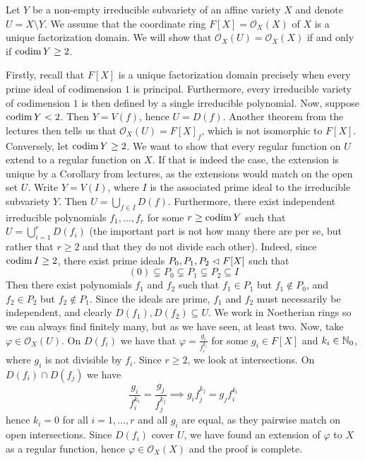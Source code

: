 \documentclass[a4paper, 12pt]{article}
\begin{document}
\begin{Exercise}
    Let $Y$ be a non-empty irreducible subvariety of an affine variety $X$ and denote $U = X \setminus Y$.
    We assume that the coordinate ring $F[X] = \mathcal{O}_X(X)$ of $X$ is a unique factorization domain.
    We will show that $\mathcal{O}_X(U) = \mathcal{O}_X(X)$ if and only if $\operatorname{codim} Y \geq 2$.

    Firstly, recall that $F[X]$ is a unique factorization domain precisely when every prime ideal of codimension $1$ is principal.
    Furthermore, every irreducible variety of codimension $1$ is then defined by a single irreducible polynomial.
    Now, suppose $\operatorname{codim} Y < 2$. Then $Y = V(f)$, hence $U = D(f)$.
    Another theorem from the lectures then tells us that $\mathcal{O}_X(U) = F[X]_f$, which is not isomorphic to $F[X]$.
    Conversely, let $\operatorname{codim} Y \geq 2$.
    We want to show that every regular function on $U$ extend to a regular function on $X$.
    If that is indeed the case, the extension is unique by a Corollary from lectures, as the extensions would match on the open set $U$.
    Write $Y = V(I)$, where $I$ is the associated prime ideal to the irreducible subvariety $Y$.
    Then $U = \bigcup_{f \in I} D(f)$.
    Furthermore, there exist independent irreducible polynomials $f_1,\dots,f_r$ for some $r \geq \operatorname{codim} Y$ such that $U = \bigcup_{i = 1}^{r} D(f_i)$
    (the important part is not how many there are per se, but rather that $r \geq 2$ and that they do not divide each other).
    Indeed, since $\operatorname{codim} I \geq 2$, there exist prime ideals $P_0, P_1, P_2 \vartriangleleft F[X]$ such that
    \[
        (0) \subsetneq P_0 \subsetneq P_1 \subsetneq P_2 \subseteq I
    \]
    Then there exist polynomials $f_1$ and $f_2$ such that $f_1 \in P_1$ but $f_1 \notin P_0$, and $f_2 \in P_2$ but $f_2 \notin P_1$.
    Since the ideals are prime, $f_1$ and $f_2$ must necessarily be independent, and clearly $D(f_1),D(f_2) \subseteq U$.
    We work in Noetherian rings so we can always find finitely many, but as we have seen, at least two.
    Now, take $\varphi \in \mathcal{O}_X(U)$.
    On $D(f_i)$ we have that $\varphi = \frac{g_i}{f_i^{k_i}}$ for some $g_i \in F[X]$ and $k_i \in \mathbb{N}_0$, where $g_i$ is not divisible by $f_i$.
    Since $r \geq 2$, we look at intersections.
    On $D(f_i) \cap D(f_j)$ we have
    \[
        \frac{g_i}{f_i^{k_i}} = \frac{g_j}{f_j^{k_j}} \implies g_if_j^{k_j} = g_jf_i^{k_i}
    \]
    hence $k_i = 0$ for all $i = 1,\dots, r$ and all $g_i$ are equal, as they pairwise match on open intersections.
    Since $D(f_i)$ cover $U$, we have found an extension of $\varphi$ to $X$ as a regular function, hence $\varphi \in \mathcal{O}_X(X)$ and the proof is complete.


\end{Exercise}
\end{document}
